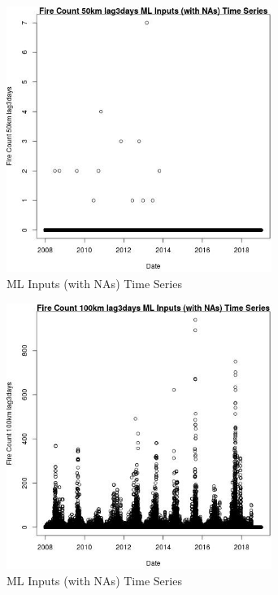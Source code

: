 \begin{figure} 
\centering  
\includegraphics[width=0.77\textwidth]{Code_Outputs/Report_ML_input_PM25_Step4_part_e_de_duplicated_aves_compiled_2019-05-21wNAs_Fire_Count_50km_lag3daysvDate.jpg} 
\caption{\label{fig:Report_ML_input_PM25_Step4_part_e_de_duplicated_aves_compiled_2019-05-21wNAsFire_Count_50km_lag3daysvDate}ML Inputs (with NAs) Time Series} 
\end{figure} 
 

\begin{figure} 
\centering  
\includegraphics[width=0.77\textwidth]{Code_Outputs/Report_ML_input_PM25_Step4_part_e_de_duplicated_aves_compiled_2019-05-21wNAs_Fire_Count_100km_lag3daysvDate.jpg} 
\caption{\label{fig:Report_ML_input_PM25_Step4_part_e_de_duplicated_aves_compiled_2019-05-21wNAsFire_Count_100km_lag3daysvDate}ML Inputs (with NAs) Time Series} 
\end{figure} 
 

